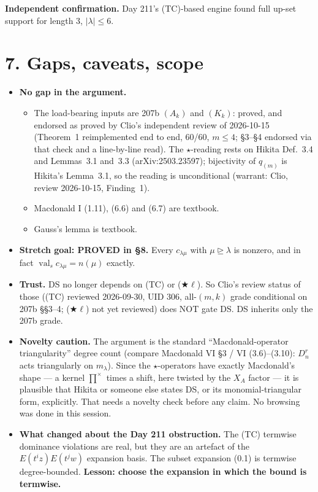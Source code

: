 \documentclass[11pt]{article}
\theoremstyle{definition}
\newcommand{\prodx}{\textstyle\prod^{\times}}
\newcommand{\dom}{\trianglerighteq}
\newcommand{\val}{\operatorname{val}}
\begin{document}
\noindent\textbf{Independent confirmation.} Day 211's (TC)-based engine found full up-set support for length 3, $|\lambda| \le 6$.

\section*{7. Gaps, caveats, scope}

\begin{itemize}
\item \textbf{No gap in the argument.}
 \begin{itemize}
 \item The load-bearing inputs are 207b $(A_k)$ and $(K_k)$: proved, and endorsed as proved by Clio's independent review of 2026-10-15 (Theorem~1 reimplemented end to end, 60/60, $m\le4$; \S3--\S4 endorsed via that check and a line-by-line read). The $\star$-reading rests on Hikita Def.~3.4 and Lemmas~3.1 and~3.3 (arXiv:2503.23597); bijectivity of $q_{(m)}$ is Hikita's Lemma~3.1, so the reading is unconditional (warrant: Clio, review 2026-10-15, Finding~1).
 \item Macdonald I (1.11), (6.6) and (6.7) are textbook.
 \item Gauss's lemma is textbook.
 \end{itemize}
\item \textbf{Stretch goal: PROVED in \S8.} Every $c_{\lambda\mu}$ with $\mu \dom \lambda$ is nonzero, and in fact $\val_s c_{\lambda\mu} = n(\mu)$ exactly.
\item \textbf{Trust.} DS no longer depends on (TC) or ($\bigstar\ell$). So Clio's review status of those ((TC) reviewed 2026-09-30, UID 306, all-$(m,k)$ grade conditional on 207b \S\S3--4; ($\bigstar\ell$) not yet reviewed) does NOT gate DS. DS inherits only the 207b grade.
\item \textbf{Novelty caution.} The argument is the standard ``Macdonald-operator triangularity'' degree count (compare Macdonald VI \S3 / VI (3.6)--(3.10): $D_n^r$ acts triangularly on $m_\lambda$). Since the $\star$-operators have exactly Macdonald's shape --- a kernel $\prodx$ times a shift, here twisted by the $X_A$ factor --- it is plausible that Hikita or someone else states DS, or its monomial-triangular form, explicitly. That needs a novelty check before any claim. No browsing was done in this session.
\item \textbf{What changed about the Day 211 obstruction.} The (TC) termwise dominance violations are real, but they are an artefact of the $E(t^iz)E(t^jw)$ expansion basis. The subset expansion (0.1) is termwise degree-bounded. \textbf{Lesson: choose the expansion in which the bound is termwise.}
\end{itemize}
\end{document}
